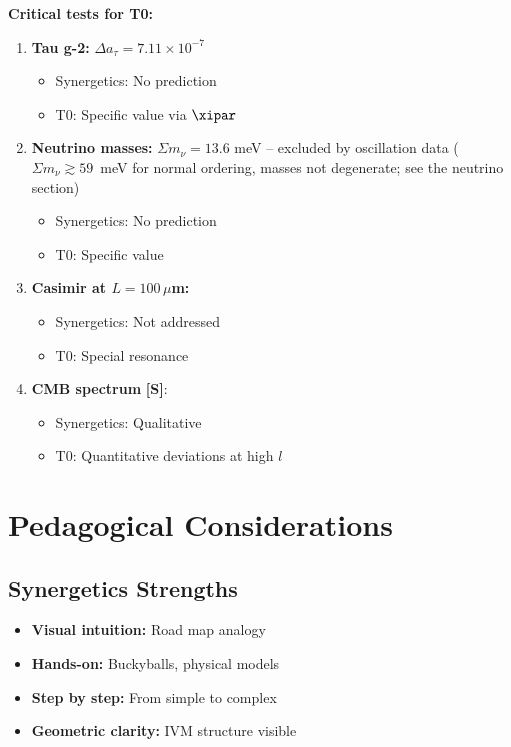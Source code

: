 	\begin{vorteil}
		\textbf{Critical tests for T0:}
		
		\begin{enumerate}
			\item \textbf{Tau g-2:} $\Delta a_\tau = 7.11 \times 10^{-7}$
			\begin{itemize}
				\item Synergetics: No prediction
				\item T0: Specific value via $\xipar$
			\end{itemize}
			
			\item \textbf{Neutrino masses:} $\Sigma m_\nu = 13.6$ meV -- excluded by oscillation data ($\Sigma m_\nu \gtrsim 59$~meV for normal ordering, masses not degenerate; see the neutrino section)
			\begin{itemize}
				\item Synergetics: No prediction
				\item T0: Specific value
			\end{itemize}
			
			\item \textbf{Casimir at $L = 100\,\mu$m:}
			\begin{itemize}
				\item Synergetics: Not addressed
				\item T0: Special resonance
			\end{itemize}
			
			\item \textbf{CMB spectrum} \textbf{[S]}:
			\begin{itemize}
				\item Synergetics: Qualitative
				\item T0: Quantitative deviations at high $l$
			\end{itemize}
		\end{enumerate}
	\end{vorteil}
	
	\section{Pedagogical Considerations}
	
	\subsection{Synergetics Strengths}
	
	\begin{itemize}
		\item \textbf{Visual intuition:} Road map analogy
		\item \textbf{Hands-on:} Buckyballs, physical models
		\item \textbf{Step by step:} From simple to complex
		\item \textbf{Geometric clarity:} IVM structure visible
	\end{itemize}
	
